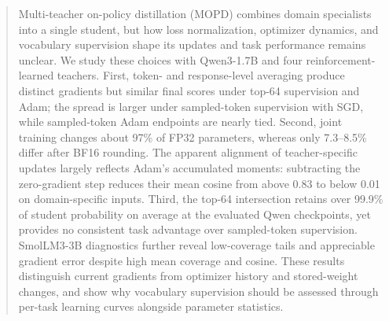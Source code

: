 \begin{abstract}
Multi-teacher on-policy distillation (MOPD) combines domain specialists into a single student, but how loss normalization, optimizer dynamics, and vocabulary supervision shape its updates and task performance remains unclear. We study these choices with Qwen3-1.7B and four reinforcement-learned teachers. First, token- and response-level averaging produce distinct gradients but similar final scores under top-64 supervision and Adam; the spread is larger under sampled-token supervision with SGD, while sampled-token Adam endpoints are nearly tied. Second, joint training changes about 97\% of FP32 parameters, whereas only 7.3--8.5\% differ after BF16 rounding. The apparent alignment of teacher-specific updates largely reflects Adam's accumulated moments: subtracting the zero-gradient step reduces their mean cosine from above 0.83 to below 0.01 on domain-specific inputs. Third, the top-64 intersection retains over 99.9\% of student probability on average at the evaluated Qwen checkpoints, yet provides no consistent task advantage over sampled-token supervision. SmolLM3-3B diagnostics further reveal low-coverage tails and appreciable gradient error despite high mean coverage and cosine. These results distinguish current gradients from optimizer history and stored-weight changes, and show why vocabulary supervision should be assessed through per-task learning curves alongside parameter statistics.
\end{abstract}
